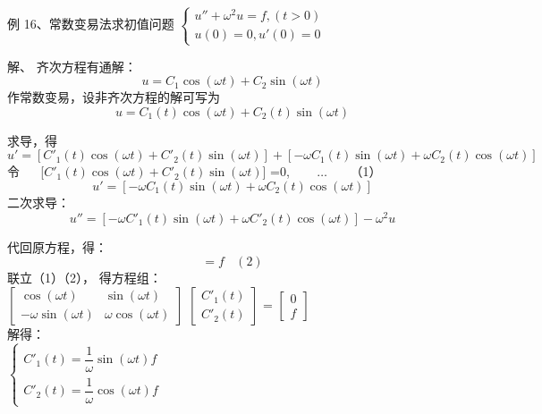 \begin{frame}
	\begin{exampleblock} {例 16、常数变易法求初值问题}
	$\begin{cases}
		u'' +\omega ^2 u =f, (t>0)\\
		u(0)=0, u'(0)=0
	\end{cases}$
	\end{exampleblock}
	\alert{解、} 齐次方程有通解：
	\begin{equation*}
		u=C_1 \cos(\omega t)+C_2 \sin(\omega t)
	\end{equation*}     
	作常数变易，设非齐次方程的解可写为 
	\begin{equation*}
		u=C_1(t) \cos(\omega t)+C_2(t) \sin(\omega t)
	\end{equation*}    
\end{frame}

\begin{frame}
	求导，得
	\begin{equation*}
		u'=[C'_1(t) \cos(\omega t)+C'_2(t) \sin(\omega t)] + [  - \omega C_1(t) \sin(\omega t)+ \omega C_2(t) \cos(\omega t)  ]
	\end{equation*}    
	令 ~~ [$C'_1(t) \cos(\omega t)+C'_2(t) \sin(\omega t)$] =0,  ~~~ $\dots$  ~~~（1）\\
	\begin{equation*}
		u'= [  - \omega C_1(t) \sin(\omega t)+ \omega C_2(t) \cos(\omega t)  ]
	\end{equation*}    
	二次求导：
	\begin{equation*}
		u''= [  - \omega C'_1(t) \sin(\omega t)+ \omega C'_2(t) \cos(\omega t)  ] -\omega^2 u
	\end{equation*}  
\end{frame}

\begin{frame}
	代回原方程，得：
	\begin{equation*}
		[  - \omega C'_1(t) \sin(\omega t)+ \omega C'_2(t) \cos(\omega t)  ] =f      ~~~~  \left( 2\right)
	\end{equation*}  
	联立（1）（2）， 得方程组：\\  	
	$\begin{bmatrix}
		\cos(\omega t) & \sin(\omega t) \\ 
		-\omega \sin(\omega t) & \omega\cos(\omega t)
	\end{bmatrix} $
	$\begin{bmatrix}
		C'_1(t)\\ 
		C'_2(t)
	\end{bmatrix} $ =
	$\begin{bmatrix}
		0\\ 
		f
	\end{bmatrix} $ \\ \vspace{0.3cm}
	解得：\\  
	$\displaystyle \begin{cases}
		C'_1(t)=\dfrac{1}{\omega} \sin(\omega t) f \\ 
		C'_2(t)=\dfrac{1}{\omega} \cos(\omega t) f 
	\end{cases} $ 
\end{frame}

